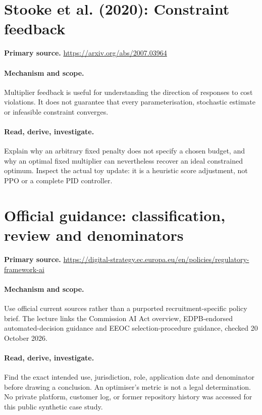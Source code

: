 \documentclass[11pt]{scrartcl}
\begin{document}
\section{Stooke et al. (2020): Constraint feedback}
\noindent\textbf{Primary source.} \url{https://arxiv.org/abs/2007.03964}

\paragraph{Mechanism and scope.} Multiplier feedback is useful for understanding the direction of responses to cost violations. It does not guarantee that every parameterisation, stochastic estimate or infeasible constraint converges.

\paragraph{Read, derive, investigate.} Explain why an arbitrary fixed penalty does not specify a chosen budget, and why an optimal fixed multiplier can nevertheless recover an ideal constrained optimum. Inspect the actual toy update: it is a heuristic score adjustment, not PPO or a complete PID controller.

\section{Official guidance: classification, review and denominators}
\noindent\textbf{Primary source.} \url{https://digital-strategy.ec.europa.eu/en/policies/regulatory-framework-ai}

\paragraph{Mechanism and scope.} Use official current sources rather than a purported recruitment-specific policy brief. The lecture links the Commission AI Act overview, EDPB-endorsed automated-decision guidance and EEOC selection-procedure guidance, checked 20 October 2026.

\paragraph{Read, derive, investigate.} Find the exact intended use, jurisdiction, role, application date and denominator before drawing a conclusion. An optimiser's metric is not a legal determination. No private platform, customer log, or former repository history was accessed for this public synthetic case study.
\end{document}
